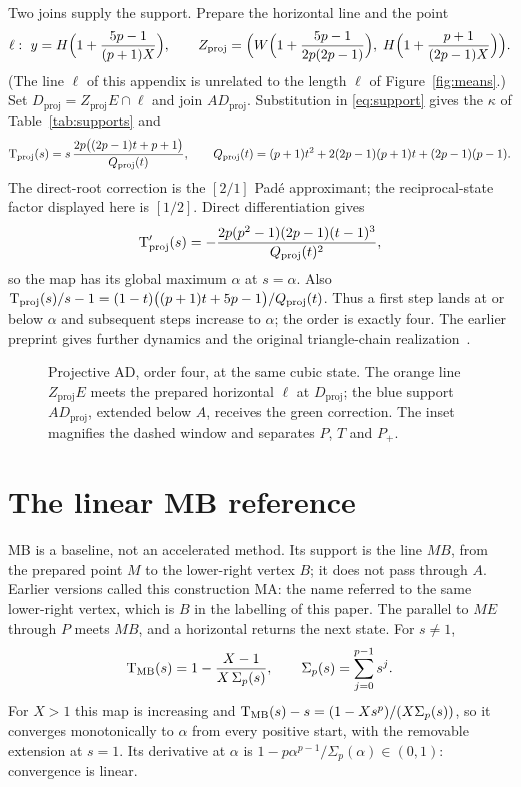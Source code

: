 Two joins supply the support. Prepare the horizontal line and the point
\[ \ell:\ y=H\Bigl(1+\frac{5p-1}{(p+1)X}\Bigr),\qquad
Z_{\mathrm{proj}}=\Bigl(W\Bigl(1+\frac{5p-1}{2p(2p-1)}\Bigr),\;H\Bigl(1+\frac{p+1}{(2p-1)X}\Bigr)\Bigr). \]
(The line $\ell$ of this appendix is unrelated to the length $\ell$ of Figure~\ref{fig:means}.) Set
$D_{\mathrm{proj}}=Z_{\mathrm{proj}}E\cap\ell$ and join $AD_{\mathrm{proj}}$. Substitution in
\eqref{eq:support} gives the $\kappa$ of Table~\ref{tab:supports} and
\begin{equation}\label{eq:proj}
\mathrm{T}_{\mathrm{proj}}(s)=s\,\frac{2p\bigl((2p-1)t+p+1\bigr)}{Q_{\mathrm{proj}}(t)},\qquad
Q_{\mathrm{proj}}(t)=(p+1)t^{2}+2(2p-1)(p+1)t+(2p-1)(p-1).
\end{equation}
The direct-root correction is the $[2/1]$ Pad\'e approximant; the reciprocal-state factor displayed
here is $[1/2]$. Direct differentiation gives
\[ \mathrm{T}_{\mathrm{proj}}'(s)=-\frac{2p(p^{2}-1)(2p-1)(t-1)^{3}}{Q_{\mathrm{proj}}(t)^{2}}, \]
so the map has its global maximum $\alpha$ at $s=\alpha$. Also
$\mathrm{T}_{\mathrm{proj}}(s)/s-1=(1-t)\bigl((p+1)t+5p-1\bigr)/Q_{\mathrm{proj}}(t)$. Thus a first step lands
at or below $\alpha$ and subsequent steps increase to $\alpha$; the order is exactly four. The
earlier preprint gives further dynamics and the original triangle-chain realization~\cite{v20}.

\begin{figure}[h]
\centering\figProjective
\caption{Projective AD, order four, at the same cubic state. The orange line $Z_{\mathrm{proj}}E$ meets
the prepared horizontal $\ell$ at $D_{\mathrm{proj}}$; the blue support $AD_{\mathrm{proj}}$, extended
below $A$, receives the green correction. The inset magnifies the dashed window and separates $P$, $T$
and $P_+$.}\label{fig:proj}
\end{figure}

\section{The linear MB reference}\label{app:mb}

MB is a baseline, not an accelerated method. Its support is the line $MB$, from the prepared point $M$
to the lower-right vertex $B$; it does not pass through $A$. Earlier versions called this construction
MA: the name referred to the same lower-right vertex, which is $B$ in the labelling of this paper. The
parallel to $ME$ through $P$ meets $MB$, and a horizontal returns the next state. For $s\neq1$,
\[ \mathrm{T}_{\mathrm{MB}}(s)=1-\frac{X-1}{X\,\Sigma_p(s)},\qquad \Sigma_p(s)=\sum_{j=0}^{p-1}s^{j}. \]
For $X>1$ this map is increasing and
$\mathrm{T}_{\mathrm{MB}}(s)-s=(1-Xs^{p})/(X\Sigma_p(s))$, so it converges monotonically to $\alpha$ from every
positive start, with the removable extension at $s=1$. Its derivative at $\alpha$ is
$1-p\alpha^{p-1}/\Sigma_p(\alpha)\in(0,1)$: convergence is linear.

